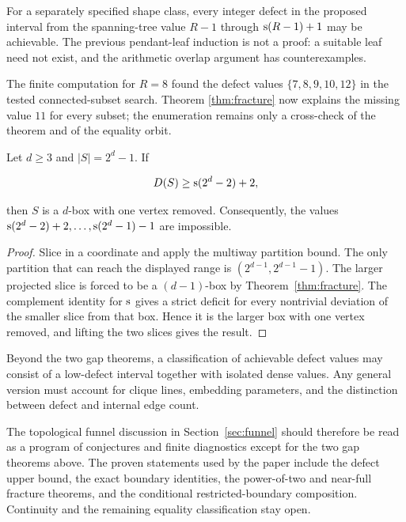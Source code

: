 \begin{conjecture}\label{thm:continuity}
For a separately specified shape class, every integer defect in the proposed
interval from the spanning-tree value $R-1$ through $\mathrm{s}(R-1)+1$ may be
achievable. The previous pendant-leaf induction is not a proof: a suitable
leaf need not exist, and the arithmetic overlap argument has counterexamples.
\end{conjecture}

The finite computation for $R=8$ found the defect values
$\{7,8,9,10,12\}$ in the tested connected-subset search. Theorem
\ref{thm:fracture} now explains the missing value $11$ for every subset; the
enumeration remains only a cross-check of the theorem and of the equality
orbit.

\begin{theorem}\label{thm:secondary-gap}
Let $d\ge3$ and $|S|=2^d-1$.  If

\[
D(S)\ge \mathrm{s}(2^d-2)+2,
\]

then $S$ is a $d$-box with one vertex removed.  Consequently, the values
$\mathrm{s}(2^d-2)+2,\ldots,\mathrm{s}(2^d-1)-1$ are impossible.
\end{theorem}

\begin{proof}
Slice in a coordinate and apply the multiway partition bound.  The only
partition that can reach the displayed range is
$(2^{d-1},2^{d-1}-1)$.  The larger projected slice is forced to be a
$(d-1)$-box by Theorem~\ref{thm:fracture}.  The complement identity for
$\mathrm{s}$ gives a strict deficit for every nontrivial deviation of the smaller
slice from that box.  Hence it is the larger box with one vertex removed,
and lifting the two slices gives the result.
\end{proof}

\begin{conjecture}\label{thm:classification}
Beyond the two gap theorems, a classification of achievable defect values may
consist of a low-defect interval together with isolated dense values. Any
general version must account for clique lines, embedding parameters, and the
distinction between defect and internal edge count.
\end{conjecture}

The topological funnel discussion in Section~\ref{sec:funnel} should therefore
be read as a program of conjectures and finite diagnostics except for the two
gap theorems above. The proven statements used by the paper include the defect
upper bound, the exact boundary identities, the power-of-two and near-full
fracture theorems, and the conditional restricted-boundary composition.
Continuity and the remaining equality classification stay open.
